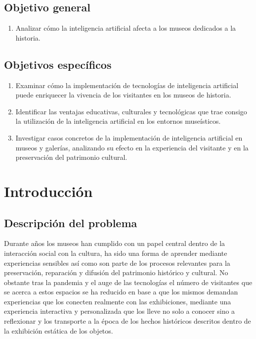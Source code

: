 \documentclass[pdflatex,sn-mathphys-num]{sn-jnl}%
\theoremstyle{thmstyleone}%
\theoremstyle{thmstyletwo}%
\theoremstyle{thmstylethree}%
\begin{document}
\subsection{Objetivo general}
\begin{enumerate}
    \item Analizar cómo la inteligencia artificial afecta a los museos dedicados a la historia.
\end{enumerate}

\subsection{Objetivos específicos}
\begin{enumerate}
    \item Examinar cómo la implementación de tecnologías de inteligencia artificial puede enriquecer la vivencia de los visitantes en los museos de historia.
    \item Identificar las ventajas educativas, culturales y tecnológicas que trae consigo la utilización de la inteligencia artificial en los entornos museísticos.
    \item Investigar casos concretos de la implementación de inteligencia artificial en museos y galerías, analizando su efecto en la experiencia del visitante y en la preservación del patrimonio cultural.
\end{enumerate}
  

\section{Introducción}\label{sec1}
\subsection{Descripción del problema}
Durante años los museos han cumplido con un papel central dentro de la interacción social con la cultura, ha sido una forma de aprender mediante experiencias sensibles así como son parte de los procesos relevantes para la preservación, reparación y difusión del patrimonio histórico y cultural. No obstante tras la pandemia y el auge de las tecnologías el número de visitantes que se acerca a estos espacios se ha reducido en base a que los mismos demandan experiencias que los conecten realmente con las exhibiciones, mediante una experiencia interactiva y personalizada que los lleve no solo a conocer sino a reflexionar y los transporte a la época de los hechos históricos descritos dentro de la exhibición estática de los objetos.
\end{document}
